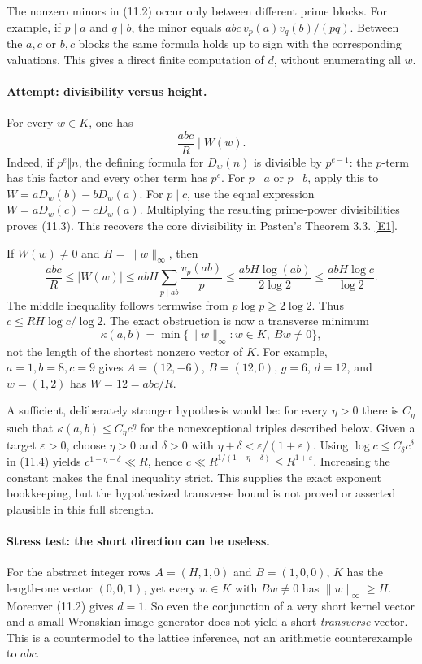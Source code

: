 \documentclass[11pt,a4paper]{article}
\newcommand{\eref}[2]{\hyperlink{extra:#1:#2}{[E#2]}}
\begin{document}
The nonzero minors in (11.2) occur only between different prime blocks.
For example, if $p\mid a$ and $q\mid b$, the minor equals
$abc\,v_p(a)v_q(b)/(pq)$. Between the $a,c$ or $b,c$ blocks the same
formula holds up to sign with the corresponding valuations. This gives
a direct finite computation of $d$, without enumerating all $w$.

\paragraph{Attempt: divisibility versus height.}
For every $w\in K$, one has
\[
 \frac{abc}{R}\mid W(w). \tag{11.3}
\]
Indeed, if $p^e\Vert n$, the defining formula for $D_w(n)$ is divisible
by $p^{e-1}$: the $p$-term has this factor and every other term has
$p^e$. For $p\mid a$ or $p\mid b$, apply this to
$W=aD_w(b)-bD_w(a)$. For $p\mid c$, use the equal expression
$W=aD_w(c)-cD_w(a)$. Multiplying the resulting prime-power divisibilities
proves (11.3). This recovers the core divisibility in Pasten's
Theorem 3.3. \eref{statement}{1}.

If $W(w)\ne0$ and $H=\|w\|_\infty$, then
\[
 \frac{abc}{R}\leq |W(w)|
 \leq abH\sum_{p\mid ab}\frac{v_p(ab)}p
 \leq \frac{abH\log(ab)}{2\log2}
 \leq \frac{abH\log c}{\log2}. \tag{11.4}
\]
The middle inequality follows termwise from $p\log p\geq2\log2$.
Thus $c\leq RH\log c/\log2$. The exact obstruction is now a transverse
minimum
\[
 \kappa(a,b)=\min\{\|w\|_\infty:w\in K,\ Bw\ne0\}, \tag{11.5}
\]
not the length of the shortest nonzero vector of $K$.
For example, $a=1,b=8,c=9$ gives $A=(12,-6)$, $B=(12,0)$,
$g=6$, $d=12$, and $w=(1,2)$ has $W=12=abc/R$.

A sufficient, deliberately stronger hypothesis would be: for every
$\eta>0$ there is $C_\eta$ such that
$\kappa(a,b)\leq C_\eta c^\eta$ for the nonexceptional triples described
below. Given a target $\varepsilon>0$, choose
$\eta>0$ and $\delta>0$ with $\eta+\delta<\varepsilon/(1+\varepsilon)$.
Using $\log c\leq C_\delta c^\delta$ in (11.4) yields
$c^{1-\eta-\delta}\ll R$, hence
$c\ll R^{1/(1-\eta-\delta)}\leq R^{1+\varepsilon}$.
Increasing the constant makes the final inequality strict. This supplies
the exact exponent bookkeeping, but the hypothesized transverse bound
is not proved or asserted plausible in this full strength.

\paragraph{Stress test: the short direction can be useless.}
For the abstract integer rows $A=(H,1,0)$ and $B=(1,0,0)$,
$K$ has the length-one vector $(0,0,1)$, yet every $w\in K$ with
$Bw\ne0$ has $\|w\|_\infty\geq H$. Moreover (11.2) gives $d=1$.
So even the conjunction of a very short kernel vector and a small
Wronskian image generator does not yield a short \emph{transverse}
vector. This is a countermodel to the lattice inference, not an
arithmetic counterexample to $abc$.
\end{document}
